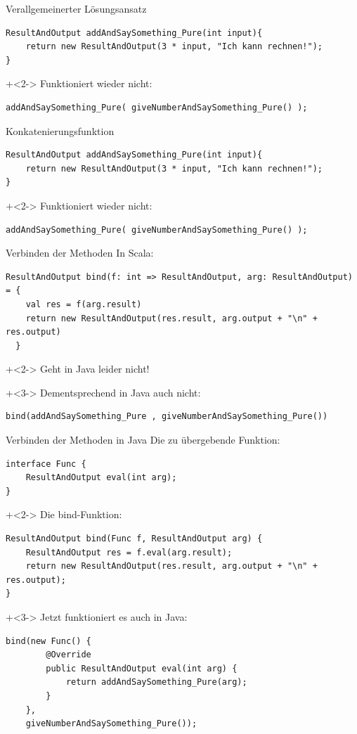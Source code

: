 \begin{frame}[fragile]{Verallgemeinerter Lösungsansatz}
\begin{lstlisting}
ResultAndOutput addAndSaySomething_Pure(int input){
    return new ResultAndOutput(3 * input, "Ich kann rechnen!");
}
\end{lstlisting}

\onslide+<2->
Funktioniert wieder nicht:
\begin{lstlisting}
addAndSaySomething_Pure( giveNumberAndSaySomething_Pure() );
\end{lstlisting}
\end{frame}


\begin{frame}[fragile]{Konkatenierungsfunktion}
\begin{lstlisting}
ResultAndOutput addAndSaySomething_Pure(int input){
    return new ResultAndOutput(3 * input, "Ich kann rechnen!");
}
\end{lstlisting}

\onslide+<2->
Funktioniert wieder nicht:
\begin{lstlisting}
addAndSaySomething_Pure( giveNumberAndSaySomething_Pure() );
\end{lstlisting}
\end{frame}


\begin{frame}[fragile]{Verbinden der Methoden}
In Scala:
\begin{lstlisting}
ResultAndOutput bind(f: int => ResultAndOutput, arg: ResultAndOutput) = {
    val res = f(arg.result)
    return new ResultAndOutput(res.result, arg.output + "\n" + res.output)
  }
\end{lstlisting}
\onslide+<2->
Geht in Java leider nicht!


\onslide+<3->
Dementsprechend in Java auch nicht:
\begin{lstlisting}
bind(addAndSaySomething_Pure , giveNumberAndSaySomething_Pure())
\end{lstlisting}
\end{frame}

\begin{frame}[fragile]{Verbinden der Methoden in Java}
Die zu übergebende Funktion:
\begin{lstlisting}
interface Func {
	ResultAndOutput eval(int arg);
}
\end{lstlisting}

\onslide+<2->
Die bind-Funktion:
\begin{lstlisting}
ResultAndOutput bind(Func f, ResultAndOutput arg) {
    ResultAndOutput res = f.eval(arg.result);
    return new ResultAndOutput(res.result, arg.output + "\n" + res.output);
}
\end{lstlisting}


\onslide+<3->
Jetzt funktioniert es auch in Java:
\begin{lstlisting}
bind(new Func() {
        @Override
        public ResultAndOutput eval(int arg) {
            return addAndSaySomething_Pure(arg);
        }
    }, 
    giveNumberAndSaySomething_Pure());
\end{lstlisting}
\end{frame}

